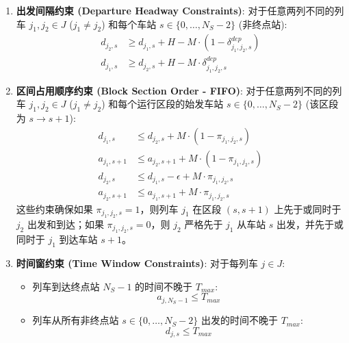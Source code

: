 \documentclass{article}
\begin{document}
\begin{enumerate}
        \item \textbf{出发间隔约束 (Departure Headway Constraints)}:
        对于任意两列不同的列车 $j_1, j_2 \in J$ ($j_1 \neq j_2$) 和每个车站 $s \in
        \{0, \dots, N_S-2\}$ (非终点站):
        \begin{equation}
            \begin{aligned}
                d_{j_2,s} &\ge d_{j_1,s} + H - M \cdot (1 -
                \delta^{dep}_{j_1,j_2,s}) \\
                d_{j_1,s} &\ge d_{j_2,s} + H - M \cdot \delta^{dep}_{j_1,j_2,s}
            \end{aligned}
            \label{eq:departure_headway}
        \end{equation}

        \item \textbf{区间占用顺序约束 (Block Section Order - FIFO)}: 对于任意两列不同的列车
        $j_1, j_2 \in J$ ($j_1 \neq j_2$) 和每个运行区段的始发车站 $s \in \{0,
        \dots, N_S-2\}$ (该区段为 $s \to s+1$):
        \begin{equation}
            \begin{aligned}
                d_{j_1,s} &\le d_{j_2,s} + M \cdot (1 - \pi_{j_1,j_2,s}) \\
                a_{j_1,s+1} &\le a_{j_2,s+1} + M \cdot (1 - \pi_{j_1,j_2,s}) \\
                d_{j_2,s} &\le d_{j_1,s} - \epsilon + M \cdot \pi_{j_1,j_2,s} \\
                a_{j_2,s+1} &\le a_{j_1,s+1} + M \cdot \pi_{j_1,j_2,s}
            \end{aligned}
            \label{eq:block_section_order}
        \end{equation}
        这些约束确保如果 $\pi_{j_1,j_2,s}=1$，则列车 $j_1$ 在区段 $(s, s+1)$ 上先于或同时于
        $j_2$ 出发和到达；如果 $\pi_{j_1,j_2,s}=0$，则 $j_2$ 严格先于 $j_1$ 从车站 $s$
        出发，并先于或同时于 $j_1$ 到达车站 $s+1$。

        \item \textbf{时间窗约束 (Time Window Constraints)}: 对于每列车 $j \in J$:
        \begin{itemize}
            \item 列车到达终点站 $N_S-1$ 的时间不晚于 $T_{max}$:
            \begin{equation}
                a_{j,N_S-1} \le T_{max}\label{eq:arrival_time_max}
            \end{equation}
            \item 列车从所有非终点站 $s \in \{0, \dots, N_S-2\}$ 出发的时间不晚于 $T_{max}$:
            \begin{equation}
                d_{j,s} \le T_{max}\label{eq:departure_time_max}
            \end{equation}
        \end{itemize}


\end{enumerate}
\end{document}
